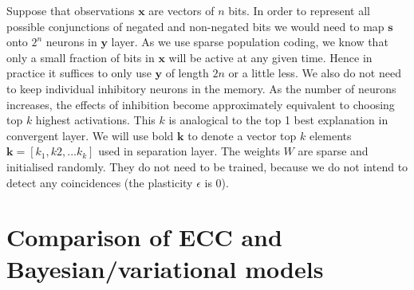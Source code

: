 \documentclass[12pt]{article}
\begin{document}
Suppose that observations $\boldsymbol{x}$ are vectors of $n$ bits. In order to represent all possible conjunctions of negated and non-negated bits we would need to map $\boldsymbol{s}$ onto $2^n$ neurons in $\boldsymbol{y}$ layer. As we use sparse population coding,  we know that only a small fraction of bits in $\boldsymbol{x}$ will be active at any given time. Hence in practice it suffices to only use $\boldsymbol{y}$ of length $2n$ or a little less. We also do not need to keep individual inhibitory neurons in the memory. As the number of neurons increases, the effects of inhibition become approximately equivalent to choosing top $k$ highest activations. This $k$ is analogical to the top 1 best explanation in convergent layer. We will use bold $\boldsymbol{k}$ to denote a vector top $k$ elements $\boldsymbol{k}=[k_1,k2,...k_k]$ used in separation layer. 
The weights $W$ are sparse and initialised randomly. They do not need to be trained, because we do not intend to detect any coincidences (the plasticity $\epsilon$ is $0$). 
\fi

\section{Comparison of ECC and Bayesian/variational models}
\end{document}
